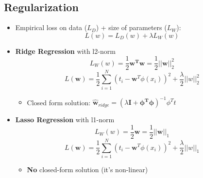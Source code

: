\documentclass[12pt]{article} %
\begin{document}
\subsection{Regularization}
\begin{itemize}

\item Empirical loss on data ($L_D$) + size of parameters ($L_W$):
$$ L(w) = L_D(w) + \lambda L_W(w)$$

\item \textbf{Ridge Regression} with l2-norm
$$ L_W(w) = \frac{1}{2}\bm{w^T w}= \frac{1}{2}||\bm{w}||^2_2$$
$$ L(\bm{w}) = \frac{1}{2} \sum \limits_{i=1}^{N} (t_i -\bm{w}^T \phi(x_i))^2 + \frac{\lambda}{2}||w||^2_2$$
\begin{itemize}
\item Closed form solution:  $\hat{\bm{w}}_{ridge} = (\lambda \bm{I} + \bm{\phi^T \phi})^{-1} \phi^T t$
\end{itemize}

\item \textbf{Lasso Regression} with l1-norm
$$ L_W(w) = \frac{1}{2}\bm{w}= \frac{1}{2}||\bm{w}||_1$$
$$ L(\bm{w}) = \frac{1}{2} \sum \limits_{i=1}^{N} (t_i -\bm{w}^T \phi(x_i))^2 + \frac{\lambda}{2}||w||_1$$
\begin{itemize}
\item \textbf{No} closed-form solution (it's non-linear)
\end{itemize}
\end{itemize}
\end{document}
